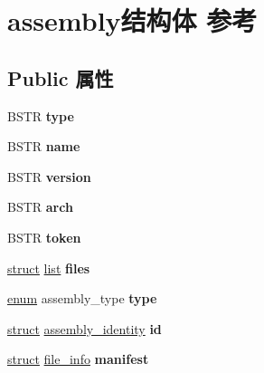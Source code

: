\hypertarget{structassembly}{}\section{assembly结构体 参考}
\label{structassembly}
\subsection*{Public 属性}
\begin{DoxyCompactItemize}
\item 
\mbox{\label{structassembly_a3952a086d7c8837627fe1ca3e3614a43}} 
B\+S\+TR {\bfseries type}
\item 
\mbox{\label{structassembly_a87343bff80ec54fd1831ef9afe16613a}} 
B\+S\+TR {\bfseries name}
\item 
\mbox{\label{structassembly_a37763cae5bff41daca210bf8ba3953fa}} 
B\+S\+TR {\bfseries version}
\item 
\mbox{\label{structassembly_ac504e27fc8b8a4c25c63639ab43a6b1c}} 
B\+S\+TR {\bfseries arch}
\item 
\mbox{\label{structassembly_a5eff8a47ab7b03569b3a81da30971204}} 
B\+S\+TR {\bfseries token}
\item 
\mbox{\label{structassembly_a843ab9e251b46eba3bcdf1fd76b9107a}} 
\hyperlink{interfacestruct}{struct} \hyperlink{classlist}{list} {\bfseries files}
\item 
\mbox{\label{structassembly_ab05a0c667f9729d6aa82d4a2dcda9fd5}} 
\hyperlink{interfaceenum}{enum} assembly\+\_\+type {\bfseries type}
\item 
\mbox{\label{structassembly_a572467b7fe6159918f8c445de7ba64c3}} 
\hyperlink{interfacestruct}{struct} \hyperlink{structassembly__identity}{assembly\+\_\+identity} {\bfseries id}
\item 
\mbox{\label{structassembly_a9a2790f5104125eefcb621e82c069dd0}} 
\hyperlink{interfacestruct}{struct} \hyperlink{structfile__info}{file\+\_\+info} {\bfseries manifest}
\item 

\end{DoxyCompactItemize}
